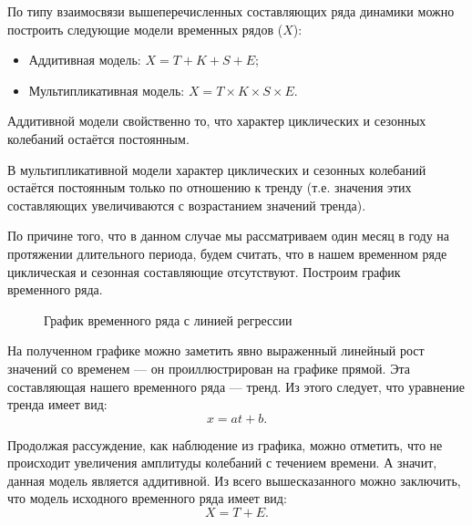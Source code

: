 По типу взаимосвязи вышеперечисленных составляющих ряда динамики можно построить следующие модели временных рядов ($X$):

\begin{itemize}
	\item Аддитивная модель: $X = T + K + S + E$;
	\item Мультипликативная модель: $X = T \times K \times S \times E$.
\end{itemize}
Аддитивной модели свойственно то, что характер циклических и сезонных колебаний остаётся постоянным.

В мультипликативной модели характер циклических и сезонных колебаний остаётся постоянным только по отношению к тренду (т.е. значения этих составляющих увеличиваются с возрастанием значений тренда).

По причине того, что в данном случае мы рассматриваем один месяц в году на протяжении длительного периода, будем считать, что в нашем временном ряде циклическая и сезонная составляющие отсутствуют. Построим график временного ряда.

\begin{figure}[ht]
\caption{График временного ряда с линией регрессии}
\label{img:ts_regr}
\end{figure}

На полученном графике можно заметить явно выраженный линейный рост значений со временем --- он проиллюстрирован на графике прямой. Эта составляющая нашего временного ряда --- тренд. Из этого следует, что уравнение тренда имеет вид:
\begin{equation*}
	x = at + b.
\end{equation*}

Продолжая рассуждение, как наблюдение из графика, можно отметить, что не происходит увеличения амплитуды колебаний с течением времени. А значит, данная модель является аддитивной. Из всего вышесказанного можно заключить, что модель исходного временного ряда имеет вид:
\begin{equation*}
	X = T + E.
\end{equation*}

